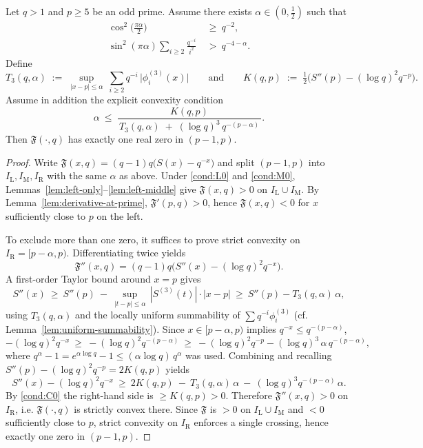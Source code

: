 \begin{theorem}\label{thm:uniq-companion-F}
Let $q>1$ and $p\ge5$ be an odd prime. Assume there exists $\alpha\in(0,\tfrac12)$ such that
\begin{align}
\cos^2\!\Big(\tfrac{\pi\alpha}{2}\Big)\ &\ge\ q^{-2}, \tag{L0}\label{cond:L0}\\
\sin^2(\pi\alpha)\!\!\sum_{i\ge2}\frac{q^{-i}}{i^2}\ &>\ q^{-4-\alpha}. \tag{M0}\label{cond:M0}
\end{align}
Define
\[
T_3(q,\alpha)\;:=\;\sup_{|x-p|\le \alpha}\ \sum_{i\ge2} q^{-i}\, \big|\phi_i^{(3)}(x)\big|
\qquad\text{and}\qquad 
K(q,p)\;:=\;\tfrac12\Big(S''(p)-(\log q)^2 q^{-p}\Big).
\]
Assume in addition the explicit convexity condition
\begin{equation}\tag{C0}\label{cond:C0}
\alpha\ \le\ \frac{K(q,p)}{\,T_3(q,\alpha)\;+\;(\log q)^3\,q^{-(p-\alpha)}\,}.
\end{equation}
Then $\mathfrak F(\cdot,q)$ has exactly one real zero in $(p-1,p)$.
\end{theorem}

\begin{proof}
Write $\mathfrak F(x,q)=(q-1)q\big(S(x)-q^{-x}\big)$ and split $(p-1,p)$ into $I_{\mathrm L},I_{\mathrm M},I_{\mathrm R}$ with the same $\alpha$ as above. Under \eqref{cond:L0} and \eqref{cond:M0}, Lemmas~\ref{lem:left-only}–\ref{lem:left-middle} give $\mathfrak F(x,q)>0$ on $I_{\mathrm L}\cup I_{\mathrm M}$. By Lemma~\ref{lem:derivative-at-prime}, $\mathfrak F'(p,q)>0$, hence $\mathfrak F(x,q)<0$ for $x$ sufficiently close to $p$ on the left.

To exclude more than one zero, it suffices to prove strict convexity on $I_{\mathrm R}=[p-\alpha,p)$. Differentiating twice yields
\[
\mathfrak F''(x,q)=(q-1)q\Big(S''(x)-(\log q)^2 q^{-x}\Big).
\]
A first-order Taylor bound around $x=p$ gives
\[
S''(x)\ \ge\ S''(p)\ -\ \sup_{|t-p|\le\alpha}\,|S^{(3)}(t)|\cdot|x-p|\ \ge\ S''(p)-T_3(q,\alpha)\,\alpha,
\]
using $T_3(q,\alpha)$ and the locally uniform summability of $\sum q^{-i}\phi_i^{(3)}$ (cf. Lemma~\ref{lem:uniform-summability}). Since $x\in[p-\alpha,p)$ implies $q^{-x}\le q^{-(p-\alpha)}$, 
\[
-(\log q)^2 q^{-x}\ \ge\ -(\log q)^2 q^{-(p-\alpha)}\ \ge\ -(\log q)^2 q^{-p}-(\log q)^3\,\alpha\,q^{-(p-\alpha)},
\]
where $q^{\alpha}-1=e^{\alpha\log q}-1\le(\alpha\log q)\,q^{\alpha}$ was used. Combining and recalling $S''(p)-(\log q)^2q^{-p}=2K(q,p)$ yields
\[
S''(x)-(\log q)^2q^{-x}\ \ge\ 2K(q,p)\ -\ T_3(q,\alpha)\,\alpha\ -\ (\log q)^3 q^{-(p-\alpha)}\,\alpha.
\]
By \eqref{cond:C0} the right-hand side is $\ge K(q,p)>0$. Therefore $\mathfrak F''(x,q)>0$ on $I_{\mathrm R}$, i.e. $\mathfrak F(\cdot,q)$ is strictly convex there. Since $\mathfrak F$ is $>0$ on $I_{\mathrm L}\cup I_{\mathrm M}$ and $<0$ sufficiently close to $p$, strict convexity on $I_{\mathrm R}$ enforces a single crossing, hence exactly one zero in $(p-1,p)$.
\end{proof}

